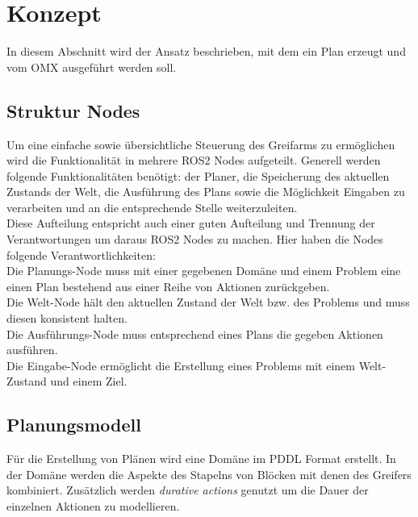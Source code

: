 \section{Konzept}
In diesem Abschnitt wird der Ansatz beschrieben, mit dem ein Plan erzeugt und vom OMX ausgeführt werden soll.
\subsection{Struktur Nodes}
Um eine einfache sowie übersichtliche Steuerung des Greifarms zu ermöglichen wird die Funktionalität in mehrere ROS2 Nodes aufgeteilt. Generell werden folgende Funktionalitäten benötigt: der Planer, die Speicherung des aktuellen Zustands der Welt, die Ausführung des Plans sowie die Möglichkeit Eingaben zu verarbeiten und an die entsprechende Stelle weiterzuleiten.\\
Diese Aufteilung entspricht auch einer guten Aufteilung und Trennung der Verantwortungen um daraus ROS2 Nodes zu machen. Hier haben die Nodes folgende Verantwortlichkeiten:\\
Die Planungs-Node muss mit einer gegebenen Domäne und einem Problem eine einen Plan bestehend aus einer Reihe von Aktionen zurückgeben.\\
Die Welt-Node hält den aktuellen Zustand der Welt bzw. des Problems und muss diesen konsistent halten.\\
Die Ausführungs-Node muss entsprechend eines Plans die gegeben Aktionen ausführen.\\
Die Eingabe-Node ermöglicht die Erstellung eines Problems mit einem Welt-Zustand und einem Ziel.
\subsection{Planungsmodell}
Für die Erstellung von Plänen wird eine Domäne im PDDL Format erstellt. In der Domäne werden die Aspekte des Stapelns von Blöcken mit denen des Greifers kombiniert. Zusätzlich werden \emph{durative actions} genutzt um die Dauer der einzelnen Aktionen zu modellieren.